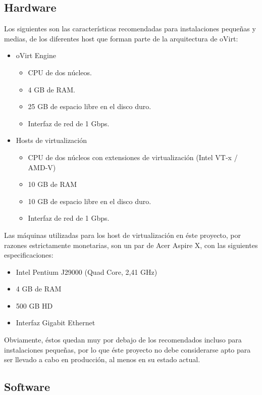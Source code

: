 \subsection{Hardware}
\label{subsubsec:hardware}

Los siguientes son las características recomendadas para instalaciones pequeñas y medias, de los diferentes host que forman parte de la arquitectura de oVirt:

\begin{itemize}
\item oVirt Engine
  \begin{itemize}
  \item CPU de dos núcleos.
  \item 4 GB de RAM.\@
  \item 25 GB de espacio libre en el disco duro.
  \item Interfaz de red de 1 Gbps.
  \end{itemize}
\item Hosts de virtualización
  \begin{itemize}
  \item CPU de dos núcleos con extensiones de virtualización (Intel VT-x / AMD-V)
  \item 10 GB de RAM
  \item 10 GB de espacio libre en el disco duro.
  \item Interfaz de red de 1 Gbps.
  \end{itemize}
\end{itemize}

Las máquinas utilizadas para los host de virtualización en éste proyecto, por razones estrictamente monetarias, son un par de Acer Aspire X, con las siguientes especificaciones:

\begin{itemize}
    \item Intel Pentium J29000 (Quad Core, 2,41 GHz)
    \item 4 GB de RAM
    \item 500 GB HD
    \item Interfaz Gigabit Ethernet
\end{itemize}

Obviamente, éstos quedan muy por debajo de los recomendados incluso para instalaciones pequeñas, por lo que éste proyecto no debe considerarse apto para ser llevado a cabo en producción, al menos en su estado actual.

\subsection{Software}
\label{subsubsec:software}

